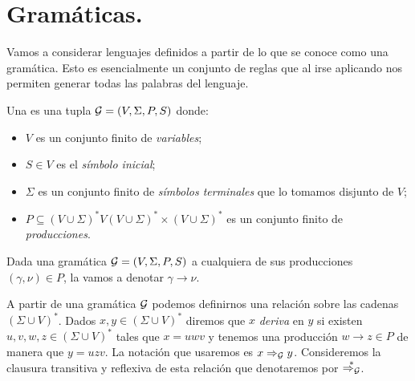 \documentclass[tesis.tex]{subfiles}
\newcommand{\deriva}{\overset{*}{\Rightarrow_{\cal G}}}
\begin{document}
\begin{comment}
	\begin{obs}
	De esta manera podemos pensar a una {presentación} de un monoide $M$  como un epimorfismo de monoides $\pi: \Sigma^{*} \to M$. Esto nos dice que el monoide $M$ tiene como generadores a $\Sigma$ y sus relaciones están dadas por el núcleo del morfismo $\pi$.
	\end{obs}
\end{comment}
\section{Gramáticas.}
Vamos a considerar lenguajes definidos a partir de lo que se conoce como una gramática. Esto es esencialmente un conjunto de reglas que al irse aplicando nos permiten generar todas las palabras del lenguaje.

\begin{deff}
	Una  es una tupla ${\cal G} = (V, \Sigma, P, S)$ donde:
	\begin{itemize}
		\item $V$ es un conjunto finito de \emph{variables};
		\item $S \in V$ es el \emph{símbolo inicial};
		\item $\Sigma$ es un conjunto finito de \emph{símbolos terminales} que lo tomamos disjunto de $V$;
		\item $P \subseteq (V \cup \Sigma)^*V(V \cup \Sigma)^* \times (V \cup \Sigma)^*$ es un conjunto finito de \emph{producciones}.
	\end{itemize}
\end{deff}

Dada una gramática ${\cal G} = (V, \Sigma, P, S)$ a cualquiera de sus producciones $(\gamma, \nu) \in P$, la vamos a denotar $\gamma \to \nu$. 

A partir de una gramática $\cal G$ podemos definirnos una relación sobre las cadenas $(\Sigma \cup V)^*$. 
Dados $x,y \in (\Sigma \cup V)^*$ diremos que $x$ \emph{deriva} en $y$ si existen $u,v,w,z \in (\Sigma \cup V)^*$ tales que $x = uwv$ y tenemos una producción $w \to z \in P$ de manera que $y=uzv$.
La notación que usaremos es $x \Rightarrow_{\cal G} y$. 
Consideremos la clausura transitiva y reflexiva de esta relación que denotaremos por $\deriva$.

 
\end{document}

